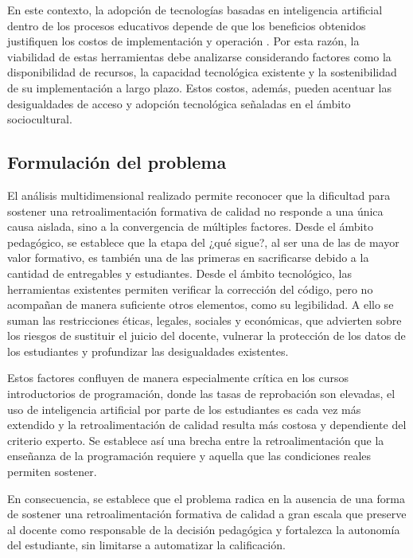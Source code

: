\documentclass[letterpaper, 10 pt, conference]{ieeeconf}
\begin{document}
En este contexto, la adopción de tecnologías basadas en inteligencia artificial dentro de los procesos educativos depende de que los beneficios obtenidos justifiquen los costos de implementación y operación \cite{19}. Por esta razón, la viabilidad de estas herramientas debe analizarse considerando factores como la disponibilidad de recursos, la capacidad tecnológica existente y la sostenibilidad de su implementación a largo plazo. Estos costos, además, pueden acentuar las desigualdades de acceso y adopción tecnológica señaladas en el ámbito sociocultural. 


\subsection{Formulación del problema} 

El análisis multidimensional realizado permite reconocer que la dificultad para sostener una retroalimentación formativa de calidad no responde a una única causa aislada, sino a la convergencia de múltiples factores. Desde el ámbito pedagógico, se establece que la etapa del ¿qué sigue?, al ser una de las de mayor valor formativo, es también una de las primeras en sacrificarse debido a la cantidad de entregables y estudiantes. Desde el ámbito tecnológico, las herramientas existentes permiten verificar la corrección del código, pero no acompañan de manera suficiente otros elementos, como su legibilidad. A ello se suman las restricciones éticas, legales, sociales y económicas, que advierten sobre los riesgos de sustituir el juicio del docente, vulnerar la protección de los datos de los estudiantes y profundizar las desigualdades existentes.

Estos factores confluyen de manera especialmente crítica en los cursos introductorios de programación, donde las tasas de reprobación son elevadas, el uso de inteligencia artificial por parte de los estudiantes es cada vez más extendido y la retroalimentación de calidad resulta más costosa y dependiente del criterio experto. Se establece así una brecha entre la retroalimentación que la enseñanza de la programación requiere y aquella que las condiciones reales permiten sostener.

En consecuencia, se establece que el problema radica en la ausencia de una forma de sostener una retroalimentación formativa de calidad a gran escala que preserve al docente como responsable de la decisión pedagógica y fortalezca la autonomía del estudiante, sin limitarse a automatizar la calificación. 
\end{document}
